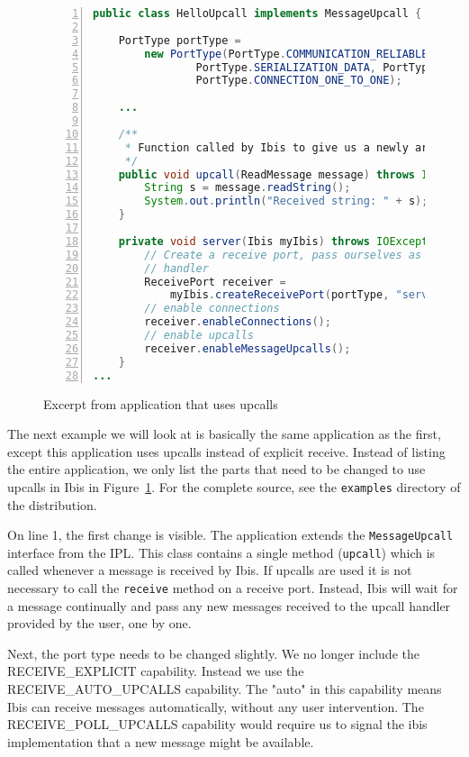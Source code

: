 \begin{figure}[ht]
\lstset{basicstyle=\footnotesize,breaklines=false}
\begin{lstlisting}[language=Java,numbers=left, numbersep=3pt]
public class HelloUpcall implements MessageUpcall {

    PortType portType =
        new PortType(PortType.COMMUNICATION_RELIABLE,
                PortType.SERIALIZATION_DATA, PortType.RECEIVE_AUTO_UPCALLS,
                PortType.CONNECTION_ONE_TO_ONE);

    ...

    /**
     * Function called by Ibis to give us a newly arrived message
     */
    public void upcall(ReadMessage message) throws IOException {
        String s = message.readString();
        System.out.println("Received string: " + s);
    }

    private void server(Ibis myIbis) throws IOException {
        // Create a receive port, pass ourselves as the message upcall
        // handler
        ReceivePort receiver =
            myIbis.createReceivePort(portType, "server", this);
        // enable connections
        receiver.enableConnections();
        // enable upcalls
        receiver.enableMessageUpcalls();
    }
...
\end{lstlisting}
\caption{Excerpt from application that uses upcalls}
\label{hello_upcall_source}
\end{figure}

The next example we will look at is basically the same application as
the first, except this application uses upcalls instead of explicit
receive. Instead of listing the entire application, we only list the
parts that need to be changed to use upcalls in Ibis in
Figure~\ref{hello_upcall_source}. For the complete source, see the
\texttt{examples} directory of the distribution.

On line 1, the first change is visible. The application extends the
\texttt{MessageUpcall} interface from the IPL. This class contains a
single method (\texttt{upcall}) which is called whenever a message is
received by Ibis. If upcalls are used it is not necessary to call the
\texttt{receive} method on a receive port. Instead, Ibis will wait for a
message continually and pass any new messages received to the upcall
handler provided by the user, one by one.

Next, the port type needs to be changed slightly. We no longer include
the RECEIVE\_EXPLICIT capability. Instead we use the
RECEIVE\_AUTO\_UPCALLS capability. The "auto" in this capability means
Ibis can receive messages automatically, without any user intervention.
The RECEIVE\_POLL\_UPCALLS capability would require us to signal the
ibis implementation that a new message might be available.

